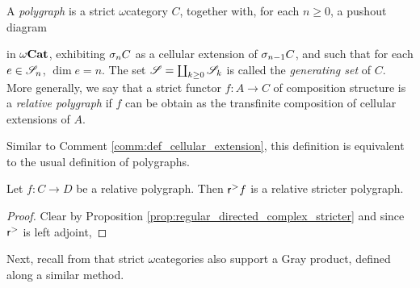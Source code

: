 \begin{dfn} [Polygraph]
    A \emph{polygraph} is a strict \( \omega \)\nbd category \( C \), together with, for each \( n \geq 0 \), a pushout diagram
    \begin{center}
    \end{center}
    in \( {\omega\mathbf{Cat}} \), exhibiting \( \sigma_{n}C \) as a cellular extension of \( \sigma_{n - 1}C \), and such that for each \( e \in \mathscr{S}_n \), \( \dim e = n \).
    The set \( \mathscr{S} = \coprod_{k \geq 0} \mathscr{S}_k \) is called the \emph{generating set} of \( C \).
    More generally, we say that a strict functor \( f \colon A \to C \) of composition structure is a \emph{relative polygraph} if \( f \) can be obtain as the transfinite composition of cellular extensions of \( A \).
\end{dfn}

\begin{rmk}
    Similar to Comment \ref{comm:def_cellular_extension}, this definition is equivalent to the usual definition of polygraphs.
\end{rmk}

\begin{lem} \label{lem:reflection_of_polygraphs_are_stricter_polygraphs}
    Let \( f \colon C \to D \) be a relative polygraph.
    Then \( \mathsf{r}^{>} f \) is a relative stricter polygraph.
\end{lem}
\begin{proof}
    Clear by Proposition \ref{prop:regular_directed_complex_stricter} and since \( \mathsf{r}^{>} \) is left adjoint, 
\end{proof}

Next, recall from \cite[Appendice A]{ara2020joint} that strict \( \omega \)\nbd categories also support a Gray product, defined along a similar method.

